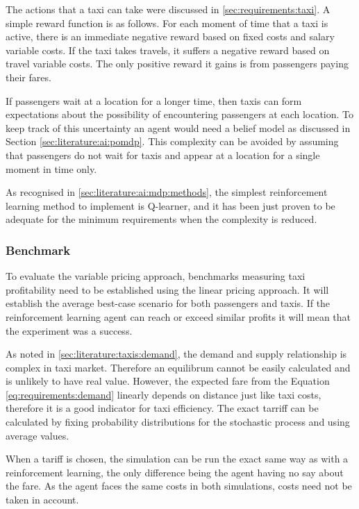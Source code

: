 The actions that a taxi can take were discussed in \ref{sec:requirements:taxi}.
A simple reward function is as follows. For each moment of time that a taxi is
active, there is an immediate negative reward based on fixed costs and salary
variable costs. If the taxi takes travels, it suffers a negative reward based
on travel variable costs. The only positive reward it gains is from passengers
paying their fares.

If passengers wait at a location for a longer time, then taxis can form
expectations about the possibility of encountering passengers at each location.
To keep track of this uncertainty an agent would need a belief model as
discussed in Section \ref{sec:literature:ai:pomdp}. This complexity can be
avoided by assuming that passengers do not wait for taxis and appear at a
location for a single moment in time only.

As recognised in \ref{sec:literature:ai:mdp:methods}, the simplest
reinforcement learning method to implement is Q-learner, and it has been just
proven to be adequate for the minimum requirements when the complexity is
reduced.


\subsubsection{Benchmark} 

To evaluate the variable pricing approach, benchmarks measuring taxi
profitability need to be established using the linear pricing approach. It will
establish the average best-case scenario for both passengers and taxis. If the
reinforcement learning agent can reach or exceed similar profits it will mean
that the experiment was a success.

As noted in \ref{sec:literature:taxis:demand}, the demand and supply
relationship is complex in taxi market. Therefore an equilibrum cannot be
easily calculated and is unlikely to have real value. However, the expected
fare from the Equation \ref{eq:requirements:demand} linearly depends on
distance just like taxi costs, therefore it is a good indicator for taxi
efficiency. The exact tarriff can be calculated by fixing probability
distributions for the stochastic process and using average values.

When a tariff is chosen, the simulation can be run the exact same way as with a
reinforcement learning, the only difference being the agent having no say about
the fare. As the agent faces the same costs in both simulations, costs need not
be taken in account.


